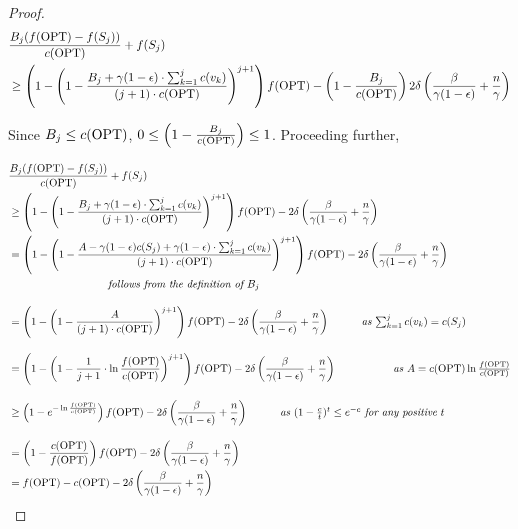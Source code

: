 \documentclass[10pt]{article} %
\theoremstyle{remark}
\newcommand{\OPT}{{\rm OPT}}
\begin{document}
\begin{proof}
\begin{align*}
    &\displaystyle\frac{B_j(f(\OPT) - f(S_{j}))}{c(\OPT)} +f(S_{j}) \\
    &\geq \left( 1- \displaystyle\left(1- \frac{B_j+\gamma(1-\epsilon)\cdot \sum_{k=1}^{j}c(v_k)}{(j+1)\cdot c(\OPT)} \right)^{j+1} \right)f(\OPT)- \left(1-\frac{B_j}{c(\OPT)}\right)2\delta\left(\frac{\beta}{\gamma(1-\epsilon)}+ \frac{n}{\gamma}\right)
\end{align*}


Since $B_j \leq c(\OPT)$, $0 \leq \left(1-\frac{B_j}{c(\OPT)}\right)\leq 1$. Proceeding further, 


\begin{align*}
    &\displaystyle\frac{B_j(f(\OPT) - f(S_{j}))}{c(\OPT)} +f(S_{j}) \\
    &\geq \left( 1- \displaystyle\left(1- \frac{B_j+\gamma(1-\epsilon)\cdot \sum_{k=1}^{j}c(v_k)}{(j+1)\cdot c(\OPT)} \right)^{j+1} \right)f(\OPT) - 2\delta\left(\frac{\beta}{\gamma(1-\epsilon)}+ \frac{n}{\gamma}\right)\\
    &= \left( 1- \displaystyle\left(1- \frac{A-\gamma(1-\epsilon)c(S_j)+\gamma(1-\epsilon)\cdot \sum_{k=1}^{j}c(v_k)}{(j+1)\cdot c(\OPT)} \right)^{j+1} \right)f(\OPT)- 2\delta\left(\frac{\beta}{\gamma(1-\epsilon)}+ \frac{n}{\gamma}\right)\\
    & \ \ \ \ \ \ \ \ \ \ \ \ \ \ \ \ \ \ \ \ \ \ \ \ \ \ \ \ \mbox{\it follows from the definition of $B_j$} \\[1em]
        &= \left( 1- \displaystyle\left( 1- \frac{A}{(j+1)\cdot c(\OPT)} \right)^{j+1} \right)f(\OPT) - 2\delta\left(\frac{\beta}{\gamma(1-\epsilon)}+ \frac{n}{\gamma}\right)\quad\quad\quad\mbox{\it as $\sum_{k=1}^{j}c(v_k) = c(S_j)$}\\[1em]
        &= \left( 1- \displaystyle\left( 1- \frac{1}{j+1}\cdot \ln \frac{f(\OPT)}{c(\OPT)} \right)^{j+1} \right)f(\OPT) - 2\delta\left(\frac{\beta}{\gamma(1-\epsilon)}+ \frac{n}{\gamma}\right) \ \ \ \ \ \ \ \ \ \ \ \ \ \ \ \ \mbox{\it as $A=c(\OPT)\ln\frac{f(\OPT)}{c(\OPT)}$} \\[1em]
        &\geq \left(1- e^{-\ln \frac{f(\OPT)}{c(\OPT)}}\right)f(\OPT) - 2\delta\left(\frac{\beta}{\gamma(1-\epsilon)}+ \frac{n}{\gamma}\right) \quad \quad \quad \mbox{\it as $(1- \frac{c}{t} )^t \leq e^{-c}$ for any positive $t$} \\[1em]
        &=\left( 1- \frac{c(\OPT)}{f(\OPT)} \right)f(\OPT) - 2\delta\left(\frac{\beta}{\gamma(1-\epsilon)}+ \frac{n}{\gamma}\right)\\
        &= f(\OPT)-c(\OPT) - 2\delta\left(\frac{\beta}{\gamma(1-\epsilon)}+ \frac{n}{\gamma}\right)
\end{align*}


\end{proof}
\end{document}
